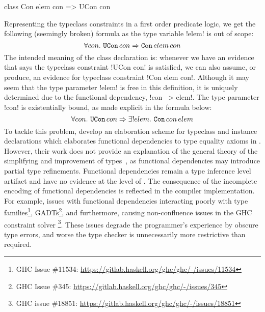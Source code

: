 \documentclass[screen,nonacm,manuscript,review]{acmart} %
\begin{document}
\begin{CenteredBox}
\begin{code}
class Con elem con => UCon con
\end{code}
\end{CenteredBox}

Representing the typeclass constraints in a first order predicate logic, we get the following
(seemingly broken) formula as the type variable !elem! is out of scope:
\[
\forall con.~\texttt{UCon}\, con \Rightarrow \texttt{Con}\, elem\, con
\]
The intended meaning of the class declaration is:
whenever we have an evidence that says the typeclass constraint
!UCon con! is satisfied, we can also assume, or produce, an
evidence for typeclass constraint !Con elem con!.
Although it may seem that the type parameter
!elem! is free in this definition, it is uniquely
determined due to the functional dependency, !con ~> elem!.
The type parameter !con! is existentially
bound, as made explicit in the formula below:
\[
\forall con.~\texttt{UCon}\, con \Rightarrow \exists! elem.~\texttt{Con}\, con\, elem
\]
To tackle this problem, \citet{karachalias_elaboration_2017} develop an
elaboration scheme for typeclass and instance declarations which
elaborates functional dependencies to type equality axioms in \SFC. However,
their work does not provide an explanation of the general theory of
the simplifying and improvement of types~\cite{jones_simplifying_1995},
as functional dependencies may introduce partial type
refinements. Functional dependencies remain a type inference level
artifact and have no evidence at the level of \SFC.
The consequence of the incomplete encoding of functional
dependencies is reflected in the compiler implementation.
For example, issues with functional dependencies interacting
poorly with type families\footnote{GHC Issue \#11534:
  \url{https://gitlab.haskell.org/ghc/ghc/-/issues/11534}},
GADTs\footnote{GHC Issue \#345:
  \url{https://gitlab.haskell.org/ghc/ghc/-/issues/345}},
and furthermore, causing non-confluence issues in the GHC constraint
solver \footnote{GHC issue \#18851:
  \url{https://gitlab.haskell.org/ghc/ghc/-/issues/18851}}.
These issues degrade the programmer's experience by
obscure type errors, and worse the type checker
is unnecessarily more restrictive than required.
\end{document}
